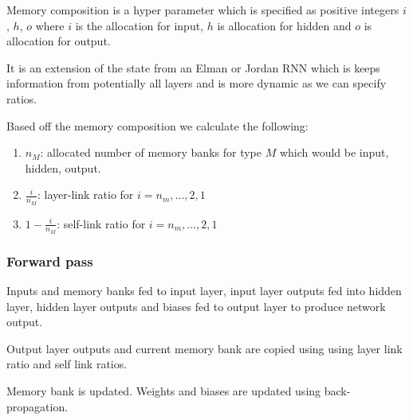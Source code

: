 \documentclass[conference]{IEEEtran}
\begin{document}
Memory composition is a hyper parameter which is specified as positive integers $i$, $h$, $o$ where $i$ is the allocation for input, $h$ is allocation for hidden and $o$ is allocation for output.

It is an extension of the state from an Elman or Jordan RNN which is keeps information from potentially all layers and is more dynamic as we can specify ratios.

Based off the memory composition we calculate the following:

\begin{enumerate}
	\item $n_M$: allocated number of memory banks for type $M$ which would be input, hidden, output.
	\item $\frac{i}{n_M}$: layer-link ratio for $i=n_m, \dots, 2, 1$
	\item $1 - \frac{i}{n_M}$: self-link ratio for $i=n_m, \dots, 2, 1$
\end{enumerate}





\subsubsection{Forward pass}

Inputs and memory banks fed to input layer, input layer outputs fed into hidden layer, hidden layer outputs and biases fed to output layer to produce network output.

Output layer outputs and current memory bank are copied using using layer link ratio and self link ratios.

Memory bank is updated. Weights and biases are updated using back-propagation.
\end{document}
